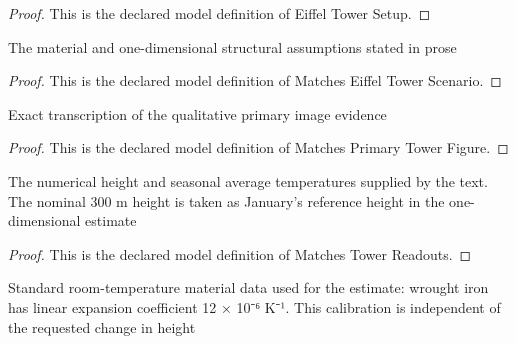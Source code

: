 \begin{proof}
  This is the declared model definition of Eiffel Tower Setup.
\end{proof}
\begin{definition}
  \label{def:physics:phyx-mini-0483:phyxminiproblems-problemphyxmini0483-matcheseiffeltowerscenario}
  The material and one-dimensional structural assumptions stated in prose
\end{definition}
\begin{proof}
  This is the declared model definition of Matches Eiffel Tower Scenario.
\end{proof}
\begin{definition}
  \label{def:physics:phyx-mini-0483:phyxminiproblems-problemphyxmini0483-matchesprimarytowerfigure}
  Exact transcription of the qualitative primary image evidence
\end{definition}
\begin{proof}
  This is the declared model definition of Matches Primary Tower Figure.
\end{proof}
\begin{definition}
  \label{def:physics:phyx-mini-0483:phyxminiproblems-problemphyxmini0483-matchestowerreadouts}
  The numerical height and seasonal average temperatures supplied by the text. The nominal 300 m height is taken as January's reference height in the one-dimensional estimate
\end{definition}
\begin{proof}
  This is the declared model definition of Matches Tower Readouts.
\end{proof}
\begin{definition}
  \label{def:physics:phyx-mini-0483:phyxminiproblems-problemphyxmini0483-usesstandardwroughtironcalibration}
  Standard room-temperature material data used for the estimate: wrought iron has linear expansion coefficient 12 × 10⁻⁶ K⁻¹. This calibration is independent of the requested change in height
\end{definition}
